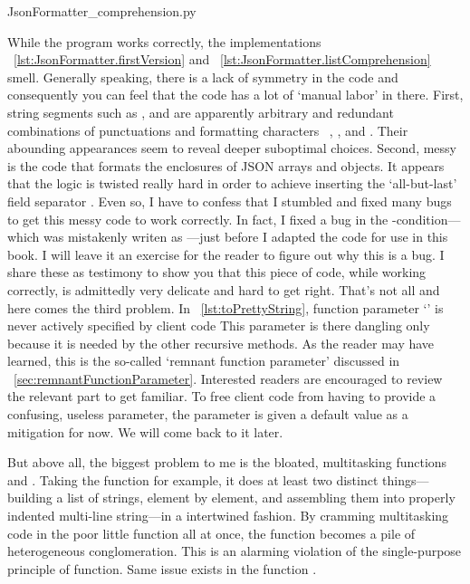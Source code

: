 
{JsonFormatter_comprehension.py}

While the program works correctly,
the implementations ~\autoref{lst:JsonFormatter.firstVersion} and
~\autoref{lst:JsonFormatter.listComprehension} smell.
Generally speaking, there is a lack of symmetry in the code and consequently
you can feel that the code has a lot of `manual labor' in there.
First, string segments such as  ,  and
\code{"[\\n"} are apparently arbitrary and redundant combinations of
punctuations and formatting characters
\ , , \code{"["} and .
Their abounding appearances seem to reveal deeper suboptimal choices.
Second, messy is the code that formats the enclosures of JSON arrays and objects.
It appears that the logic is
twisted really hard in order to achieve inserting the `all-but-last' field separator .
Even so, I have to confess that I stumbled and fixed many bugs to get this messy code to work
correctly.
In fact, I fixed a bug in the -condition---which was
mistakenly writen as ---just before I adapted the code for use in this book.
I will leave it an exercise for the reader to figure out why this is a bug.
I share these as testimony to show you that
this piece of code, while working correctly, is admittedly very delicate and hard to get right.
That's not all and here comes the third problem.
In ~\autoref{lst:toPrettyString}, function parameter `' is
never actively specified by client code
This parameter is there dangling only because it is needed by the other recursive methods.
As the reader may have learned, this is the so-called `remnant function parameter' discussed
in ~\autoref{sec:remnantFunctionParameter}.
Interested readers are encouraged to review the relevant part to get familiar.
To free client code from having to provide a confusing, useless parameter,
the parameter is given a default value  as a mitigation for now.
We will come back to it later.

But above all, the biggest problem to me is the bloated, multitasking functions
 and .
Taking the function  for example,
it does at least two distinct
things---building a list of strings, element by element, and assembling
them into properly indented multi-line string---in a intertwined fashion.
By cramming multitasking code in the poor little function all at once,
the function becomes a pile of heterogeneous conglomeration.
This is an alarming violation of the single-purpose principle of function.
Same issue exists in the function .

